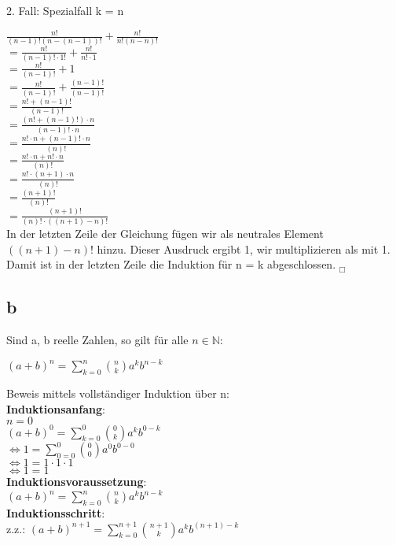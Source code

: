 \documentclass[11pt,a4paper]{article}
\begin{document}
2. Fall: Spezialfall k = n

$\frac{n!}{(n-1)!(n-(n-1))!} + \frac{n!}{n!(n-n)!}$ \\
$= \frac{n!}{(n-1)! \cdot 1!} + \frac{n!}{n!\cdot1}$ \\
$= \frac{n!}{(n-1)!} + 1$ \\
$= \frac{n!}{(n-1)!} + \frac{(n-1)!}{(n-1)!}$ \\
$= \frac{n! + (n-1)!}{(n-1)!}$ \\
$= \frac{(n! + (n-1)!)\cdot n}{(n-1)!\cdot n}$ \\
$= \frac{n! \cdot n + (n-1)!\cdot n}{(n)!}$ \\
$= \frac{n! \cdot n + n!\cdot n}{(n)!}$ \\
$= \frac{n! \cdot (n+1)\cdot n}{(n)!}$ \\
$= \frac{(n+1)!}{(n)!}$ \\
$= \frac{(n+1)!}{(n)! \cdot ((n+1)-n)!}$ \\

In der letzten Zeile der Gleichung fügen wir als neutrales Element $((n+1)-n)!$ hinzu. Dieser Ausdruck ergibt 1, wir multiplizieren als mit 1. Damit ist in der letzten Zeile die Induktion für n = k abgeschlossen.   $_{\Box}$


\subsection*{b}
Sind a, b reelle Zahlen, so gilt für alle $n \in \mathbb{N}$:

$(a + b)^n = \sum \limits_{k=0}^{n}\binom{n}{k}a^kb^{n-k}$

Beweis mittels vollständiger Induktion über n: \\

\textbf{Induktionsanfang}: \\
$ n = 0$ \\
$(a + b)^0 = \sum \limits_{k=0}^{0}\binom{0}{k}a^kb^{0-k}$ \\
$\Leftrightarrow 1 = \sum \limits_{0=0}^{0}\binom{0}{0}a^0b^{0-0}$ \\
$\Leftrightarrow 1 = 1 \cdot 1 \cdot 1$ \\
$\Leftrightarrow 1 = 1$   \checkmark \\

\textbf{Induktionsvoraussetzung}: \\
$(a + b)^n = \sum \limits_{k=0}^{n}\binom{n}{k}a^kb^{n-k}$ \\

\newpage
\textbf{Induktionsschritt}: \\
z.z.: $(a + b)^{n+1} = \sum \limits_{k=0}^{n+1}\binom{n+1}{k}a^kb^{(n+1)-k}$ \\
\end{document}
